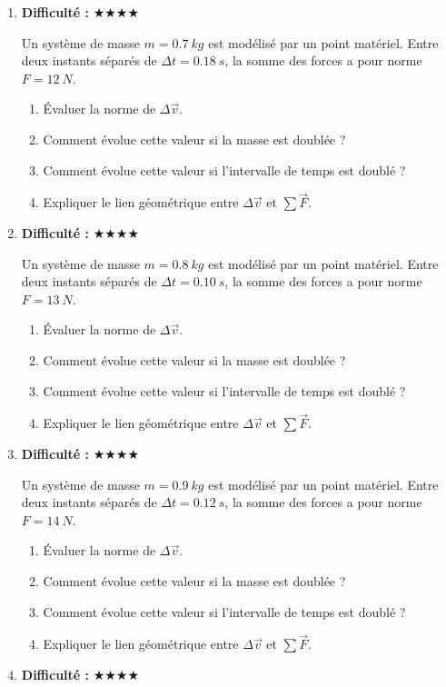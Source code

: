 \documentclass[11pt,a4paper]{article}
\newcommand{\etoiles}[1]{\textbf{Difficulté : }#1}
\begin{document}
\begin{enumerate}[label=\textbf{Exercice \arabic*.},leftmargin=*]
Un système de masse $m=0.6\ \si{kg}$ est modélisé par un point matériel.
Entre deux instants séparés de $\Delta t=0.16\ \si{s}$, la somme des forces a pour norme $F=11\ \si{N}$.
\begin{enumerate}[label=\alph*)]
\item Évaluer la norme de $\Delta \vec v$.
\item Comment évolue cette valeur si la masse est doublée ?
\item Comment évolue cette valeur si l'intervalle de temps est doublé ?
\item Expliquer le lien géométrique entre $\Delta\vec v$ et $\sum \vec F$.
\end{enumerate}
\item \etoiles{★★★★}

Un système de masse $m=0.7\ \si{kg}$ est modélisé par un point matériel.
Entre deux instants séparés de $\Delta t=0.18\ \si{s}$, la somme des forces a pour norme $F=12\ \si{N}$.
\begin{enumerate}[label=\alph*)]
\item Évaluer la norme de $\Delta \vec v$.
\item Comment évolue cette valeur si la masse est doublée ?
\item Comment évolue cette valeur si l'intervalle de temps est doublé ?
\item Expliquer le lien géométrique entre $\Delta\vec v$ et $\sum \vec F$.
\end{enumerate}
\item \etoiles{★★★★}

Un système de masse $m=0.8\ \si{kg}$ est modélisé par un point matériel.
Entre deux instants séparés de $\Delta t=0.10\ \si{s}$, la somme des forces a pour norme $F=13\ \si{N}$.
\begin{enumerate}[label=\alph*)]
\item Évaluer la norme de $\Delta \vec v$.
\item Comment évolue cette valeur si la masse est doublée ?
\item Comment évolue cette valeur si l'intervalle de temps est doublé ?
\item Expliquer le lien géométrique entre $\Delta\vec v$ et $\sum \vec F$.
\end{enumerate}
\item \etoiles{★★★★}

Un système de masse $m=0.9\ \si{kg}$ est modélisé par un point matériel.
Entre deux instants séparés de $\Delta t=0.12\ \si{s}$, la somme des forces a pour norme $F=14\ \si{N}$.
\begin{enumerate}[label=\alph*)]
\item Évaluer la norme de $\Delta \vec v$.
\item Comment évolue cette valeur si la masse est doublée ?
\item Comment évolue cette valeur si l'intervalle de temps est doublé ?
\item Expliquer le lien géométrique entre $\Delta\vec v$ et $\sum \vec F$.
\end{enumerate}
\item \etoiles{★★★★}


\end{enumerate}
\end{document}
